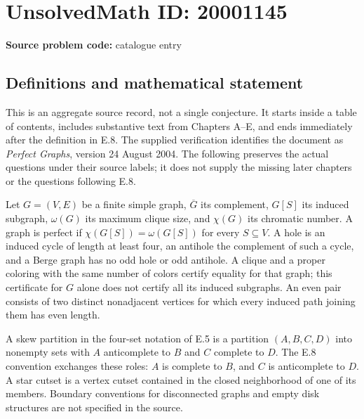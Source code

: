 \documentclass[11pt]{article}
\begin{document}
\section*{UnsolvedMath ID: 20001145}
\textbf{Source problem code:} catalogue entry
\subsection{Definitions and mathematical statement}
This is an aggregate source record, not a single conjecture. It starts inside a table of contents, includes substantive text from Chapters A--E, and ends immediately after the definition in E.8. The supplied verification identifies the document as \emph{Perfect Graphs}, version 24 August 2004. The following preserves the actual questions under their source labels; it does not supply the missing later chapters or the questions following E.8.

Let $G=(V,E)$ be a finite simple graph, $\overline G$ its complement, $G[S]$ its induced subgraph, $\omega(G)$ its maximum clique size, and $\chi(G)$ its chromatic number. A graph is perfect if $\chi(G[S])=\omega(G[S])$ for every $S\subseteq V$. A hole is an induced cycle of length at least four, an antihole the complement of such a cycle, and a Berge graph has no odd hole or odd antihole. A clique and a proper coloring with the same number of colors certify equality for that graph; this certificate for $G$ alone does not certify all its induced subgraphs. An even pair consists of two distinct nonadjacent vertices for which every induced path joining them has even length.

A skew partition in the four-set notation of E.5 is a partition $(A,B,C,D)$ into nonempty sets with $A$ anticomplete to $B$ and $C$ complete to $D$. The E.8 convention exchanges these roles: $A$ is complete to $B$, and $C$ is anticomplete to $D$. A star cutset is a vertex cutset contained in the closed neighborhood of one of its members. Boundary conventions for disconnected graphs and empty disk structures are not specified in the source.
\end{document}
